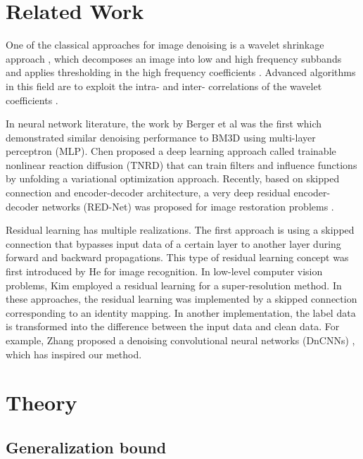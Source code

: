\documentclass[10pt,twocolumn,letterpaper]{article}
\begin{document}
\section{Related Work}


One of the classical approaches for image denoising is a wavelet shrinkage approach \cite{donoho1995noising}, which decomposes an image into low and high frequency subbands 
and applies thresholding in the high frequency coefficients \cite{portilla2003image}.
Advanced algorithms in this field are to exploit the intra- and inter- correlations of the wavelet coefficients \cite{crouse1998wavelet}.

In neural network literature, the work by Berger et al \cite{burger2012image} was the first which demonstrated similar denoising performance to BM3D using multi-layer perceptron (MLP). 
Chen \etal \cite{chen2015trainable,chen2015learning} proposed a deep learning approach called trainable
nonlinear reaction diffusion (TNRD) that
can train filters and influence functions by unfolding a variational optimization approach. Recently, based on skipped connection and encoder-decoder architecture, a very deep residual
encoder-decoder networks (RED-Net) was proposed for image restoration problems \cite{mao2016image}. 



Residual learning has multiple realizations. The first approach is using a skipped connection that bypasses input data of a certain layer to another layer during forward and backward propagations.
This type of residual learning concept was first introduced by He \etal\cite{he2015deep} for image recognition.
In low-level computer vision problems, Kim \etal\cite{kim2015accurate} employed a residual learning for a super-resolution method. 
In these approaches, the residual learning was implemented by a skipped connection corresponding to an identity mapping.
In another implementation, the label data is transformed into the difference between the input data and clean data. 
For example, Zhang \etal\cite{zhang2016beyond} proposed a denoising convolutional neural networks (DnCNNs) \cite{zhang2016beyond}, which has inspired our method.


\section{Theory}





\subsection{Generalization bound}
\end{document}
